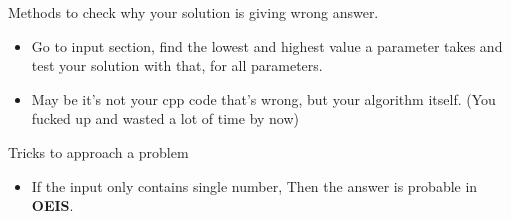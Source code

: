 \documentclass[a4paper,12pt]{report}
\begin{document}
Methods to check why your solution is giving wrong answer.
\begin{itemize}
	\item Go to input section, find the lowest and highest value a parameter takes and test your solution with that, for all parameters.
	\item May be it's not your cpp code that's wrong, but your algorithm itself. (You fucked up and wasted a lot of time by now)
\end{itemize}

Tricks to approach a problem
\begin{itemize}
	\item If the input only contains single number, Then the answer is probable in \textbf{OEIS}.
\end{itemize}











\end{document}
